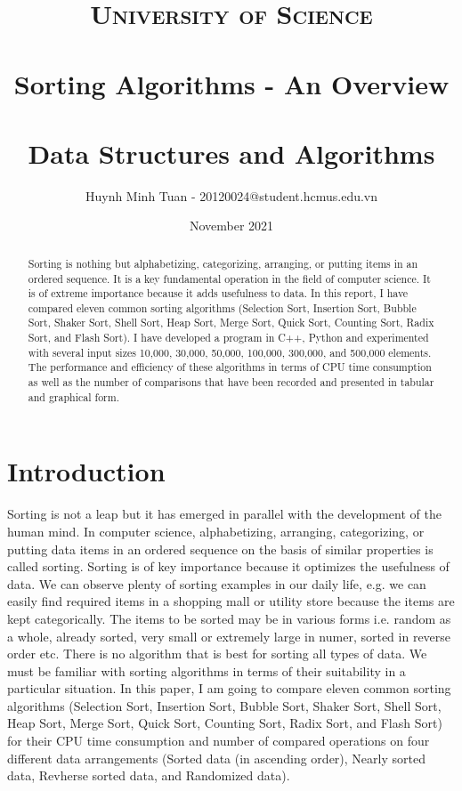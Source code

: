 \documentclass[11pt,a4paper]{article}
\title{
\normalfont \LARGE
\textsc{University of Science} \\ [25pt] %
\horrule{1pt} \\[0.4cm] %
\huge Sorting Algorithms - An Overview \\ %
\horrule{1pt} \\[0.6cm] %
\Large Data Structures and Algorithms\\[0.5cm]  %
}
\author{Huynh Minh Tuan - 20120024@student.hcmus.edu.vn}
\date{November 2021}
\newcommand\tab[1][1cm]{\hspace*{#1}}
\begin{document}
\maketitle

\begin{abstract}
    Sorting is nothing but alphabetizing, categorizing, arranging, or putting items in an ordered sequence. 
    It is a key fundamental operation in the field of computer science. It is of extreme importance because it adds usefulness to data.
    In this report, I have compared eleven common sorting algorithms (Selection Sort, Insertion Sort, Bubble Sort, Shaker Sort, Shell Sort, Heap
    Sort, Merge Sort, Quick Sort, Counting Sort, Radix Sort, and Flash Sort). I have developed a program in C++, Python and experimented with several input sizes
    10,000, 30,000, 50,000, 100,000, 300,000, and 500,000 elements. The performance and efficiency of these algorithms in terms of CPU time consumption 
    as well as the number of comparisons that have been recorded and presented in tabular and graphical form.
\end{abstract}

\section{Introduction}
\tab Sorting is not a leap but it has emerged in parallel with the development of the human mind.
In computer science, alphabetizing, arranging, categorizing, or putting data items in an ordered sequence on the basis of similar properties is called sorting.
Sorting is of key importance because it optimizes the usefulness of data.
We can observe plenty of sorting examples in our daily life, e.g. we can easily find required items in a shopping mall or utility store because the items are kept categorically.
\newline
\newline
\tab The items to be sorted may be in various forms i.e. random as a whole, already sorted, very small or extremely large in numer, sorted in reverse order etc.
There is no algorithm that is best for sorting all types of data. 
We must be familiar with sorting algorithms in terms of their suitability in a particular situation.
\newline
\newline
\tab In this paper, I am going to compare eleven common sorting algorithms (Selection Sort, Insertion Sort, Bubble Sort, Shaker Sort, Shell Sort, Heap
Sort, Merge Sort, Quick Sort, Counting Sort, Radix Sort, and Flash Sort) for their CPU time consumption and number of compared operations on four different data arrangements 
(Sorted data (in ascending order), Nearly sorted data, Revherse sorted data, and Randomized data).
\end{document}
